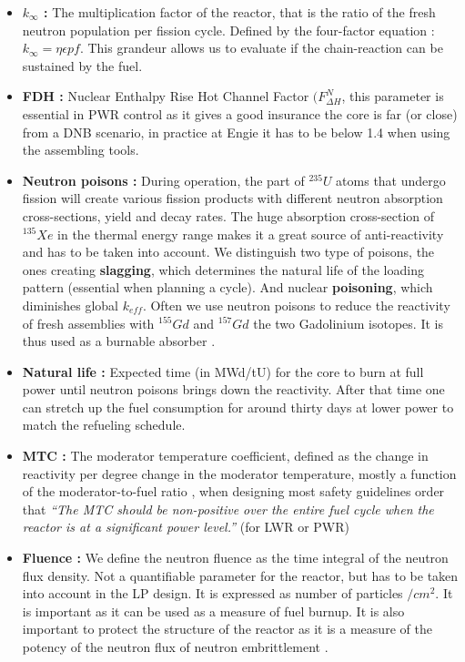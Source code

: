 \begin{itemize}
\item \textbf{$k_{\infty}$ : } The multiplication factor of the reactor, that is the ratio of the fresh neutron population per fission cycle. Defined by the four-factor equation : $k_{\infty} = \eta \epsilon pf$. This grandeur allows us to evaluate if the chain-reaction can be sustained by the fuel. 

\item \textbf{FDH : }  Nuclear Enthalpy Rise Hot Channel Factor $(F^{N}_{\Delta H}$, this parameter is essential in PWR control as it gives a good insurance the core is far (or close) from a DNB scenario, in practice at Engie it has to be below 1.4 when using the assembling tools. \cite{DBN}

\item \textbf{Neutron poisons :} During operation, the part of $^{235}U$ atoms that undergo fission will create various fission products with different neutron absorption cross-sections, yield and decay rates. The huge absorption cross-section of $^{135}Xe$ in the thermal energy range makes it a great source of anti-reactivity and has to be taken into account. We distinguish two type of poisons, the ones creating \textbf{slagging}, which determines the natural life of the loading pattern (essential when planning a cycle). And nuclear \textbf{poisoning}, which diminishes global $k_{eff}$. Often we use neutron poisons to reduce the reactivity of fresh assemblies with $^{155}Gd$ and $^{157}Gd$ the two Gadolinium isotopes. It is thus used as a burnable absorber \cite{gado}. 
\item \textbf{Natural life : }Expected time (in MWd/tU) for the core to burn at full power until neutron poisons brings down the reactivity. After that time one can stretch up the fuel consumption for around thirty days at lower power to match the refueling schedule.
\item \textbf{MTC : } The moderator temperature coefficient, defined as the change in reactivity per degree change in the moderator temperature, mostly a function of the moderator-to-fuel ratio \cite{MTC}, when designing most safety guidelines order that \textit{“The MTC should be non-positive over the entire fuel cycle when the reactor is at a significant power level.”} (for LWR or PWR)

\item \textbf{Fluence : } We define the neutron fluence as the time integral of the neutron flux density. Not a quantifiable parameter for the reactor, but has to be taken into account in the LP design. It is expressed as number of particles $/cm^2$. It is important as it can be used as a measure of fuel burnup. It is also important to protect the structure of the reactor as it is a measure of the potency of the neutron flux of neutron embrittlement \cite{fluence}.


\end{itemize}
